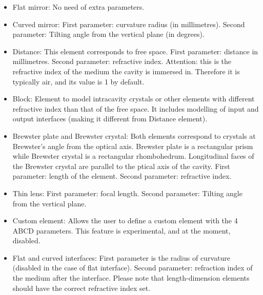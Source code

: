 \documentclass[11pt,a4paper,article,oneside]{memoir}
\begin{document}
	\begin{itemize}
		\item Flat mirror: No need of extra parameters.
		
		\item Curved mirror: First parameter: curvature radius (in millimetres). Second parameter: Tilting angle from the vertical plane (in degrees).
		
		\item Distance: This element corresponds to free space. First parameter: distance in millimetres. Second parameter: refractive index. Attention: this is the refractive index of the medium the cavity is immersed in. Therefore it is typically air, and its value is 1 by default.
		
		\item Block: Element to model intracavity crystals or other elements with different refractive index than that of the free space. It includes modelling of input and output interfaces (making it different from Distance element).
		
		\item Brewster plate and Brewster crystal: Both elements correspond to crystals at Brewster's angle from the optical axis. Brewster plate is a rectangular prism while Brewster crystal is a rectangular rhombohedrum. Longitudinal faces of the Brewster crystal are parallel to the ptical axis of the cavity. First parameter: length of the element. Second parameter: refractive index.
		
		\item Thin lens: First parameter: focal length. Second parameter: Tilting angle from the vertical plane.
		
		\item Custom element: Allows the user to define a custom element with the 4 ABCD parameters. This feature is experimental, and at the moment, disabled.
		
		\item Flat and curved interfaces: First parameter is the radius of curvature (disabled in the case of	flat interface). Second parameter: refraction index of the medium after the interface. Please note that length-dimension elements should have the correct refractive index set.
	\end{itemize}
	
	\newpage
\end{document}
